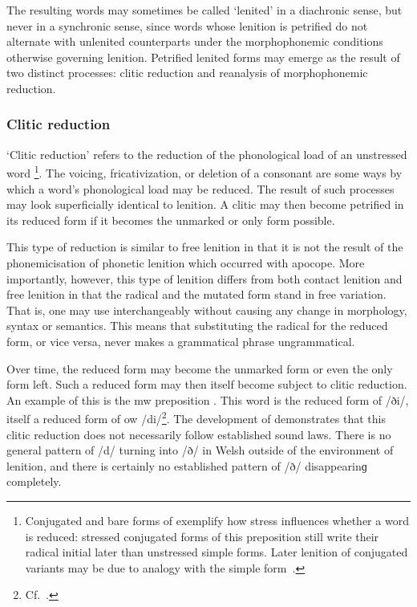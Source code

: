 The resulting words may sometimes be called `lenited' in a diachronic sense, but never in a synchronic sense, since words whose lenition is petrified do not alternate with unlenited counterparts under the morphophonemic conditions otherwise governing lenition. Petrified lenited forms may emerge as the result of two distinct processes: clitic reduction and reanalysis of morphophonemic reduction.

\subsubsection{Clitic reduction}
\label{sec:clitic-reduction}
`Clitic reduction' refers to the reduction of the phonological load of an unstressed word%
\footnote{Conjugated and bare forms of  exemplify how stress influences whether a word is reduced: stressed conjugated forms of this preposition still write their radical initial later than unstressed simple forms. Later lenition of conjugated variants may be due to analogy with the simple form~\autocite[54]{jongeleen_lenition_2016}.}. 
The voicing, fricativization, or deletion of a consonant are some ways by which a word's phonological load may be reduced.
The result of such processes may look superficially identical to lenition.
A clitic may then become petrified in its reduced form if it becomes the unmarked or only form possible. 

This type of reduction is similar to free lenition in that it is not the result of the phonemicisation of phonetic lenition which occurred with apocope.
More importantly, however, this type of lenition differs from both contact lenition and free lenition in that the radical and the mutated form stand in free variation.
That is, one may use  interchangeably without causing any change in morphology, syntax or semantics. 
This means that substituting the radical for the reduced form, or vice versa, never makes a grammatical phrase ungrammatical. 

Over time, the reduced form may become the unmarked form or even the only form left. 
Such a reduced form may then itself become subject to clitic reduction. 
An example of this is the \gls{mw} preposition . 
This word is the reduced form of  /ði/, itself a reduced form of \gls{ow}  /di/\footnote{Cf.\ .}. 
The development of  demonstrates that this clitic reduction does not necessarily follow established sound laws. 
There is no general pattern of /d/ turning into /ð/ in Welsh outside of the environment of lenition, and there is certainly no established pattern of /ð/ disappearinɡ completely.

